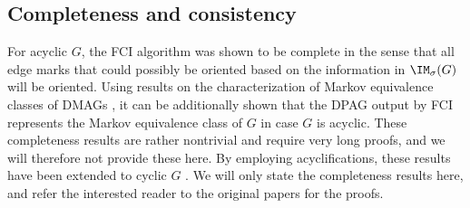 \subsection{Completeness and consistency}



For acyclic $G$, the FCI algorithm was shown to be complete \cite{Zhang2008_AI} in the sense that all edge marks that could possibly be oriented based on the information in $\IM_\sigma(G)$ will be oriented.
Using results on the characterization of Markov equivalence classes of DMAGs \cite{Ali++2005}, it can be additionally shown that the DPAG output by FCI represents the Markov equivalence class of $G$ in case $G$ is acyclic.
These completeness results are rather nontrivial and require very long proofs, and we will therefore not provide these here.
By employing acyclifications, these results have been extended to cyclic $G$ \cite{MooijClaassen_UAI_20}.
We will only state the completeness results here, and refer the interested reader to the original papers for the proofs.

